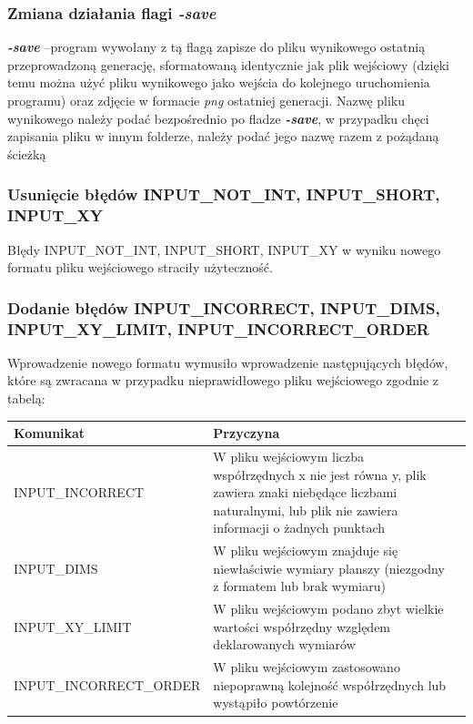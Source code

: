 \documentclass[11pt,a4paper]{report}
\begin{document}
\subsubsection {Zmiana działania flagi \textsl{\textbf{-save}}}
\textsl{\textbf{-save}} --program wywołany z tą flagą zapisze do pliku wynikowego ostatnią przeprowadzoną generację, sformatowaną identycznie jak plik wejściowy (dzięki temu można użyć pliku wynikowego jako wejścia do kolejnego uruchomienia programu) oraz zdjęcie w formacie \textsl{png} ostatniej generacji. Nazwę pliku wynikowego należy podać bezpośrednio po fladze \textsl{\textbf{-save}}, w przypadku chęci zapisania pliku w innym folderze, należy podać jego nazwę razem z pożądaną ścieżką\\

\subsubsection {Usunięcie błędów INPUT\_NOT\_INT, INPUT\_SHORT, INPUT\_XY}
Błędy INPUT\_NOT\_INT, INPUT\_SHORT, INPUT\_XY w wyniku nowego formatu pliku wejściowego straciły użyteczność.

\subsubsection {Dodanie błędów \textbf{INPUT\_INCORRECT}, \textbf{INPUT\_DIMS}, \textbf{INPUT\_XY\_LIMIT}, \textbf{INPUT\_INCORRECT\_ORDER}}
Wprowadzenie nowego formatu wymusiło wprowadzenie następujących  błędów, które są zwracana w przypadku nieprawidłowego pliku wejściowego zgodnie z tabelą:\\
\begin{tabularx}{\textwidth}{  X|Xl  }
 \hline
 Komunikat                                   					& Przyczyna\\
 \hline \hline
			INPUT\_INCORRECT			&W pliku wejściowym liczba współrzędnych x nie jest równa y, plik zawiera znaki niebędące liczbami naturalnymi, lub plik nie zawiera informacji o żadnych punktach\\
 \hline
			INPUT\_DIMS				&W pliku wejściowym znajduje się niewłaściwie wymiary planszy (niezgodny z formatem lub brak wymiaru)\\
 \hline
			INPUT\_XY\_LIMIT				&W pliku wejściowym podano zbyt wielkie wartości współrzędny względem deklarowanych wymiarów\\
\hline
			INPUT\_INCORRECT\_ORDER		&W pliku wejściowym zastosowano niepoprawną kolejność współrzędnych lub wystąpiło powtórzenie\\
 \hline
\end{tabularx}
\end{document}
